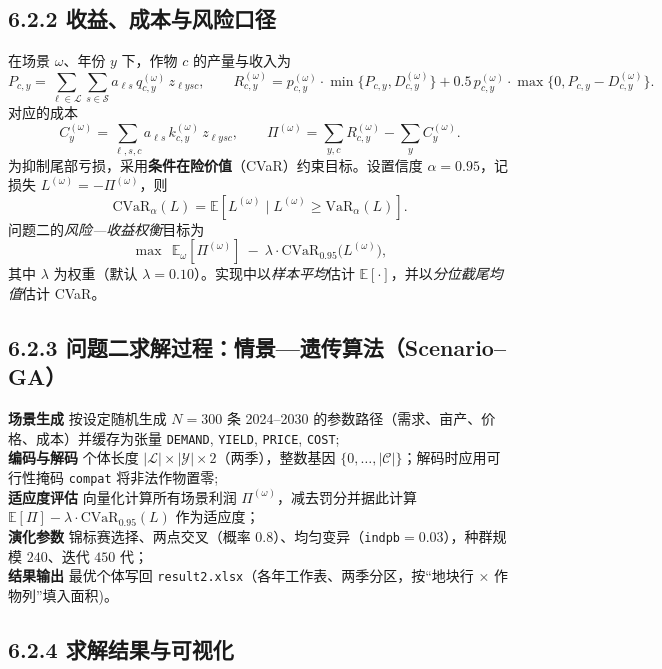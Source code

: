 \subsection{6.2.2 收益、成本与风险口径}
在场景 $\omega$、年份 $y$ 下，作物 $c$ 的产量与收入为
\[
P_{c,y}=\sum_{\ell\in\mathcal L}\sum_{s\in\mathcal S} a_{\ell s}\, q_{c,y}^{(\omega)}\, z_{\ell y s c},\qquad
R_{c,y}^{(\omega)}=p_{c,y}^{(\omega)}\!\cdot\!\min\!\{P_{c,y},D_{c,y}^{(\omega)}\}+0.5\,p_{c,y}^{(\omega)}\!\cdot\!\max\!\{0,P_{c,y}-D_{c,y}^{(\omega)}\}.
\]
对应的成本
\[
C_{y}^{(\omega)}=\sum_{\ell,s,c} a_{\ell s}\,k_{c,y}^{(\omega)}\,z_{\ell y s c},\qquad
\Pi^{(\omega)}=\sum_{y,c} R_{c,y}^{(\omega)}- \sum_y C_{y}^{(\omega)}.
\]
为抑制尾部亏损，采用\textbf{条件在险价值}（CVaR）约束目标。设置信度 $\alpha=0.95$，记损失 $L^{(\omega)}=-\Pi^{(\omega)}$，则
\[
\text{CVaR}_\alpha(L)=\mathbb{E}\!\left[L^{(\omega)}\mid L^{(\omega)}\ge \text{VaR}_\alpha(L)\right].
\]
问题二的\emph{风险—收益权衡}目标为
\[
\max\ \ \mathbb{E}_\omega[\Pi^{(\omega)}]\ -\ \lambda\cdot \text{CVaR}_{0.95}\!\big(L^{(\omega)}\big),
\]
其中 $\lambda$ 为权重（默认 $\lambda=0.10$）。实现中以\emph{样本平均}估计 $\mathbb{E}[\cdot]$，并以\emph{分位截尾均值}估计 CVaR。

\subsection{6.2.3 问题二求解过程：情景—遗传算法（Scenario--GA）} 
\noindent \textbf{场景生成} 按设定随机生成 $N=300$ 条 2024--2030 的参数路径（需求、亩产、价格、成本）并缓存为张量 \texttt{DEMAND}, \texttt{YIELD}, \texttt{PRICE}, \texttt{COST}; \\
\textbf{编码与解码} 个体长度 $|\mathcal L|\times|\mathcal Y|\times 2$（两季），整数基因 $\{0,\ldots,|\mathcal C|\}$；解码时应用可行性掩码 \texttt{compat} 将非法作物置零;  \\
\textbf{适应度评估} 向量化计算所有场景利润 $\Pi^{(\omega)}$，减去罚分并据此计算 $\mathbb{E}[\Pi]-\lambda\cdot \text{CVaR}_{0.95}(L)$ 作为适应度；  \\
\textbf{演化参数} 锦标赛选择、两点交叉（概率 $0.8$）、均匀变异（\texttt{indpb}$=0.03$），种群规模 $240$、迭代 $450$ 代；  \\
\textbf{结果输出} 最优个体写回 \verb|result2.xlsx|（各年工作表、两季分区，按“地块行 × 作物列”填入面积)。

\subsection{6.2.4 求解结果与可视化}
